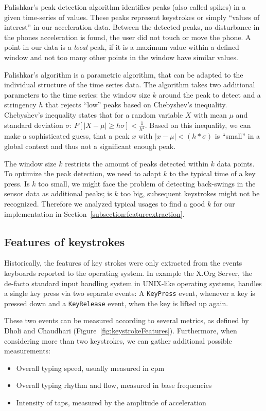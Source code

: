 Palishkar's peak detection algorithm identifies peaks (also called spikes) in a given time-series of values. These peaks represent keystrokes or simply ``values of interest'' in our acceleration data. Between the detected peaks, no disturbance in the phones acceleration is found, \ie the user did not touch or move the phone. A point in our data is a \emph{local} peak, if it is a maximum value within a defined window and not too many other points in the window have similar values.

Palishkar's algorithm is a parametric algorithm, that can be adapted to the individual structure of the time series data. The algorithm takes two additional parameters to the time series: the window size $k$ around the peak to detect and a stringency $h$ that rejects ``low'' peaks based on Chebyshev's inequality. Chebyshev's inequality states that for a random variable $X$ with mean $\mu$ and standard deviation $\sigma$: $P[|X - \mu| \geq h\sigma] < \frac{1}{h^2}$. Based on this inequality, we can make a sophisticated guess, that a peak $x$ with $|x - \mu| < (h * \sigma)$ is ``small'' in a global context and thus not a significant enough peak.

The window size $k$ restricts the amount of peaks detected within $k$ data points. To optimize the peak detection, we need to adapt $k$ to the typical time of a key press. Is $k$ too small, we might face the problem of detecting back-swings in the sensor data as additional peaks; is $k$ too big, subsequent keystrokes might not be recognized. Therefore we analyzed typical usages to find a good $k$ for our implementation in Section~\ref{subsection:featureextraction}.

\subsection{Features of keystrokes}
Historically, the features of key strokes were only extracted from the events keyboards reported to the operating system. In example the X.Org Server, the de-facto standard input handling system in UNIX-like operating systems, handles a single key press via two separate events: A \lstinline$KeyPress$ event, whenever a key is pressed down and a \lstinline$KeyRelease$ event, when the key is lifted up again.

These two events can be measured according to several metrics, as defined by Dholi and Chaudhari \cite{dholi2013typing} (\cf Figure~\ref{fig:keystrokeFeatures}). Furthermore, when considering more than two keystrokes, we can gather additional possible measurements: 
\begin{itemize}
    \item Overall typing speed, usually measured in \gls{cpm}
    \item Overall typing rhythm and flow, measured in base frequencies
    \item Intensity of taps, measured by the amplitude of acceleration
\end{itemize}

